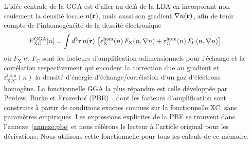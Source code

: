 L'idée centrale de la GGA est d'aller au-delà de la LDA en incorporant non seulement la densité locale $n(\mathbf{r})$, mais aussi son gradient $\nabla n(\mathbf{r})$, afin de tenir compte de l'inhomogénéité de la densité électronique
\begin{equation}
    E_\text{XC}^\text{GGA}[n]=\int d^3\mathbf{r}\,n(\mathbf{r})\,\left[\varepsilon_\text{X}^\text{hom}(n)\,F_\text{X}(n,\nabla n)+\varepsilon_\text{C}^\text{hom}(n)\,F_\text{C}(n,\nabla n)\right],
\end{equation}
où $F_\text{X}$ et $F_\text{C}$ sont les facteurs d'amplification adimensionnels pour l'échange et la corrélation respectivement qui encodent la correction due au gradient et $\varepsilon_\text{X/C}^\text{hom}(n)$ la densité d'énergie d'échange/corrélation d'un gaz d'électrons homogène. La fonctionnelle GGA la plus répandue est celle développée par Perdew, Burke et Ernzerhof (PBE)~\cite{perdewGeneralizedGradientApproximation1996a}, dont les facteurs d'amplification sont construits à partir de conditions exactes connues sur la fonctionnelle XC, sans paramètres empiriques. Les expressions explicites de la PBE se trouvent dans l'annexe~\ref{annexe:pbe} et nous référons le lecteur à l'article original pour les dérivations. Nous utilisons cette fonctionnelle pour tous les calculs de ce mémoire.

